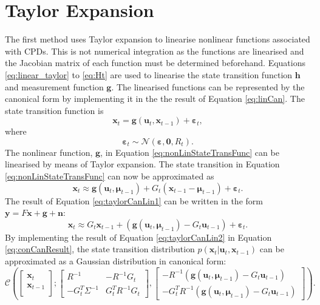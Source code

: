 \documentclass[12pt,oneside,openany,a4paper, %
afrikaans,english,
]{memoir}
\numberwithin{equation}{chapter}
\begin{document}
\section{Taylor Expansion}
The first method uses Taylor expansion to linearise nonlinear functions associated with CPDs. This is not numerical integration as the functions are linearised and the Jacobian matrix of each function must be determined beforehand.
Equations \ref{eq:linear_taylor} to \ref{eq:Ht} are used to linearise the state transition function $\bm{h}$ and measurement function $\bm{g}$.
The linearised functions can be represented by the canonical form by implementing it in the the result of Equation \ref{eq:linCan}. The state transition function is
\begin{equation}\label{eq:nonLinStateTransFunc}
\bm{x}_t = \bm{g}(\bm{u}_t, \bm{x}_{t-1}) + \bm{\varepsilon}_t,
\end{equation}
where
\begin{equation}
\bm{\varepsilon}_t \sim \mathcal{N}(\bm{\varepsilon}, \bm{0}, R_t).
\end{equation}
The nonlinear function, $\bm{g}$, in Equation \ref{eq:nonLinStateTransFunc} can be linearised by means of Taylor expansion. The state transition in Equation \ref{eq:nonLinStateTransFunc} can now be approximated as
\begin{equation}\label{eq:taylorCanLin1}
\bm{x}_t \approx \bm{g}(\bm{u}_t, \bm{\mu}_{t-1}) + G_t(\bm{x}_{t-1} - 
\bm{\mu}_{t-1}) + \bm{\varepsilon}_t.
\end{equation}
The result of Equation \ref{eq:taylorCanLin1} can be written in the form $\bm{y} = F\bm{x} + \bm{g} + \bm{n}$:
\begin{equation}\label{eq:taylorCanLin2}
\bm{x}_t \approx G_t\bm{x}_{t-1} + (\bm{g}(\bm{u}_t, \bm{\mu}_{t-1}) - G_t\bm{u}_{t-1}) + \bm{\varepsilon}_t.
\end{equation}
By implementing the result of Equation \ref{eq:taylorCanLin2} in Equation \ref{eq:conCanResult}, the state transition distribution $p(\bm{x}_t|\bm{u}_t,\bm{x}_{t-1})$ can be approximated as a Gaussian distribution in canonical form: 
\begin{equation}
\mathcal{C}\left(
\begin{bmatrix}
\bm{x}_t \\
\bm{x}_{t-1} \\
\end{bmatrix};
\begin{bmatrix}
R^{-1}  &  -R^{-1}G_t\\
-G_t^T\Sigma^{-1} & G_t^T R^{-1}G_t
\end{bmatrix}
, 
\begin{bmatrix}
-R^{-1}(\bm{g}(\bm{u}_t, \bm{\mu}_{t-1}) - G_t\bm{u}_{t-1})\\
-G_t^T R^{-1}(\bm{g}(\bm{u}_t, \bm{\mu}_{t-1}) - G_t\bm{u}_{t-1})
\end{bmatrix}
\right).
\end{equation}
\end{document}
